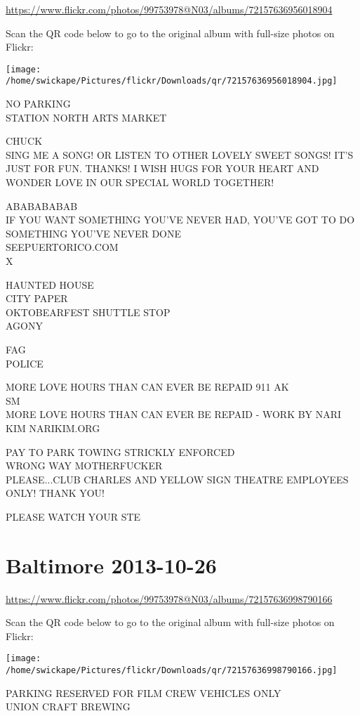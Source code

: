 \documentclass[10pt,letterpaper]{article}
\begin{document}
\url{https://www.flickr.com/photos/99753978@N03/albums/72157636956018904}

Scan the QR code below to go to the original album with full-size photos on Flickr:

\texttt{[image: /home/swickape/Pictures/flickr/Downloads/qr/72157636956018904.jpg]}


NO PARKING\\
STATION NORTH ARTS MARKET

CHUCK\\
SING ME A SONG!  OR LISTEN TO OTHER LOVELY SWEET SONGS! IT'S JUST FOR FUN. THANKS! I WISH HUGS FOR YOUR HEART AND WONDER LOVE IN OUR SPECIAL WORLD TOGETHER!

ABABABABAB\\
IF YOU WANT SOMETHING YOU'VE NEVER HAD, YOU'VE GOT TO DO SOMETHING YOU'VE NEVER DONE\\
SEEPUERTORICO.COM\\
X

HAUNTED HOUSE\\
CITY PAPER\\
OKTOBEARFEST SHUTTLE STOP\\
AGONY

FAG\\
POLICE

MORE LOVE HOURS THAN CAN EVER BE REPAID 911 AK\\
SM\\
MORE LOVE HOURS THAN CAN EVER BE REPAID {-} WORK BY NARI KIM NARIKIM.ORG

PAY TO PARK TOWING STRICKLY ENFORCED\\
WRONG WAY MOTHERFUCKER\\
PLEASE...CLUB CHARLES AND YELLOW SIGN THEATRE EMPLOYEES ONLY!  THANK YOU!

PLEASE WATCH YOUR STE


\section*{Baltimore 2013-10-26}

\url{https://www.flickr.com/photos/99753978@N03/albums/72157636998790166}

Scan the QR code below to go to the original album with full-size photos on Flickr:

\texttt{[image: /home/swickape/Pictures/flickr/Downloads/qr/72157636998790166.jpg]}


PARKING RESERVED FOR FILM CREW VEHICLES ONLY\\
UNION CRAFT BREWING
\end{document}
